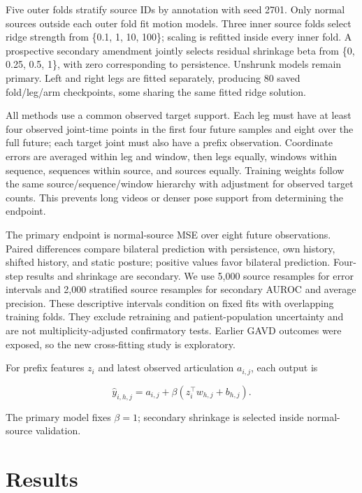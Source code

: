 \documentclass[letterpaper]{article}
\begin{document}
Five outer folds stratify source IDs by annotation with seed 2701. Only normal sources outside each outer fold fit motion models. Three inner source folds select ridge strength from \{0.1, 1, 10, 100\}; scaling is refitted inside every inner fold. A prospective secondary amendment jointly selects residual shrinkage beta from \{0, 0.25, 0.5, 1\}, with zero corresponding to persistence. Unshrunk models remain primary. Left and right legs are fitted separately, producing 80 saved fold/leg/arm checkpoints, some sharing the same fitted ridge solution.

All methods use a common observed target support. Each leg must have at least four observed joint-time points in the first four future samples and eight over the full future; each target joint must also have a prefix observation. Coordinate errors are averaged within leg and window, then legs equally, windows within sequence, sequences within source, and sources equally. Training weights follow the same source/sequence/window hierarchy with adjustment for observed target counts. This prevents long videos or denser pose support from determining the endpoint.

The primary endpoint is normal-source MSE over eight future observations. Paired differences compare bilateral prediction with persistence, own history, shifted history, and static posture; positive values favor bilateral prediction. Four-step results and shrinkage are secondary. We use 5,000 source resamples for error intervals and 2,000 stratified source resamples for secondary AUROC and average precision. These descriptive intervals condition on fixed fits with overlapping training folds. They exclude retraining and patient-population uncertainty and are not multiplicity-adjusted confirmatory tests. Earlier GAVD outcomes were exposed, so the new cross-fitting study is exploratory.

For prefix features $z_i$ and latest observed articulation $a_{i,j}$, each output is

\begin{equation}\widehat y_{i,h,j}=a_{i,j}+\beta(z_i^\top w_{h,j}+b_{h,j}).\end{equation}

The primary model fixes $\beta=1$; secondary shrinkage is selected inside normal-source validation.

\section{Results}
\end{document}
